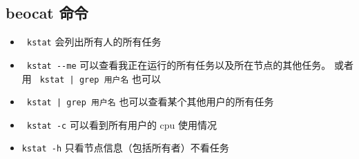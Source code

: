 \subsection{beocat 命令}
\begin{itemize}
\item \verb` kstat` 会列出所有人的所有任务
\item \verb` kstat --me` 可以查看我正在运行的所有任务以及所在节点的其他任务。 或者用 \verb` kstat | grep 用户名` 也可以
\item \verb` kstat | grep 用户名` 也可以查看某个其他用户的所有任务
\item \verb` kstat -c` 可以看到所有用户的 cpu 使用情况
\item \verb`kstat -h` 只看节点信息（包括所有者）不看任务
\end{itemize}
